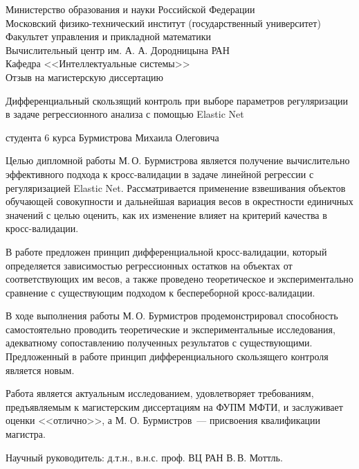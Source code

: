 \documentclass[12pt,a4paper]{amsart}
\begin{document}
\thispagestyle{empty}

\begin{center}
\sc
			Министерство образования и науки Российской Федерации\\
			Московский физико-технический институт {\rm(государственный университет)}\\
			Факультет управления и прикладной математики\\
			Вычислительный центр им. А. А. Дородницына РАН\\
			Кафедра <<Интеллектуальные системы>>\\[5mm]
\rm
\Large Отзыв на магистерскую диссертацию


\vspace{4pt}
\large
Дифференциальный скользящий контроль при выборе параметров регуляризации в задаче регрессионного анализа с помощью Elastic Net

\vspace{4pt}
\normalsize
студента 6 курса Бурмистрова Михаила Олеговича
\end{center}

Целью дипломной работы М.\,О. Бурмистрова является получение вычислительно эффективного подхода к кросс-валидации в задаче линейной регрессии с регуляризацией Elastic Net.
Рассматривается применение взвешивания объектов обучающей совокупности и дальнейшая вариация весов в окрестности единичных значений с целью оценить, как их изменение влияет на критерий качества в кросс-валидации.

\vspace{4pt}
В работе предложен принцип дифференциальной кросс-валидации, который определяется зависимостью регрессионных остатков на объектах от соответствующих им весов, а  также проведено теоретическое и экспериментально сравнение с существующим подходом к беспереборной кросс-валидации.

\vspace{4pt}
В ходе выполнения работы М.\,О. Бурмистров продемонстрировал способность самостоятельно проводить теоретические и экспериментальные исследования, адекватному сопоставлению полученных результатов с существующими. Предложенный в работе принцип дифференциального скользящего контроля является новым.

\vspace{4pt}
Работа является актуальным исследованием, удовлетворяет требованиям, предъявляемым к магистерским диссертациям на ФУПМ МФТИ, и заслуживает оценки <<отлично>>, а М. О. Бурмистров~--- присвоения квалификации магистра.

\vspace{5pt}
Научный руководитель: д.т.н., в.н.с. проф. ВЦ РАН В.\,В. Моттль.
\end{document}
